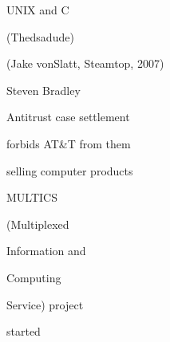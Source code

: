 \documentclass[a4paper,portrait,12pt]{article}
\begin{document}
\begin{flushleft}
UNIX and C
\end{flushleft}





\begin{flushleft}
(Thedsadude)
\end{flushleft}


\begin{flushleft}
(Jake vonSlatt, Steamtop, 2007)
\end{flushleft}





\begin{flushleft}
Steven Bradley
\end{flushleft}





\newpage
{}


\begin{flushleft}
Antitrust case settlement
\end{flushleft}


\begin{flushleft}
forbids AT\&T from them
\end{flushleft}


\begin{flushleft}
selling computer products
\end{flushleft}







\begin{flushleft}
MULTICS
\end{flushleft}


\begin{flushleft}
(Multiplexed
\end{flushleft}


\begin{flushleft}
Information and
\end{flushleft}


\begin{flushleft}
Computing
\end{flushleft}


\begin{flushleft}
Service) project
\end{flushleft}


\begin{flushleft}
started
\end{flushleft}
\end{document}
